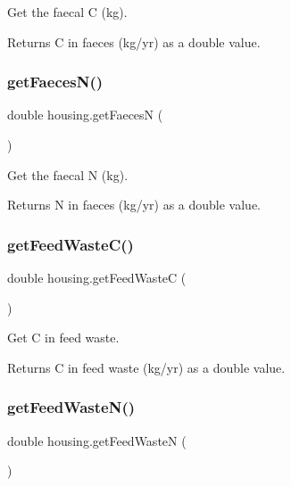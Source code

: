 Get the faecal C (kg). 

\begin{DoxyReturn}{Returns}
C in faeces (kg/yr) as a double value. 
\end{DoxyReturn}
\mbox{\label{classhousing_ae77b6199b98972e871a376aaeaf59bcd}} 
\subsubsection{\texorpdfstring{getFaecesN()}{getFaecesN()}}
{\footnotesize\ttfamily double housing.\+get\+FaecesN (\begin{DoxyParamCaption}{ }\end{DoxyParamCaption})\hspace{0.3cm}{\ttfamily [inline]}}



Get the faecal N (kg). 

\begin{DoxyReturn}{Returns}
N in faeces (kg/yr) as a double value. 
\end{DoxyReturn}
\mbox{\label{classhousing_a2ebee76702a20e253334752f00b0af8d}} 
\subsubsection{\texorpdfstring{getFeedWasteC()}{getFeedWasteC()}}
{\footnotesize\ttfamily double housing.\+get\+Feed\+WasteC (\begin{DoxyParamCaption}{ }\end{DoxyParamCaption})\hspace{0.3cm}{\ttfamily [inline]}}



Get C in feed waste. 

\begin{DoxyReturn}{Returns}
C in feed waste (kg/yr) as a double value. 
\end{DoxyReturn}
\mbox{\label{classhousing_ae8a214a1856077d2e02faa1be7d38e81}} 
\subsubsection{\texorpdfstring{getFeedWasteN()}{getFeedWasteN()}}
{\footnotesize\ttfamily double housing.\+get\+Feed\+WasteN (\begin{DoxyParamCaption}{ }\end{DoxyParamCaption})\hspace{0.3cm}{\ttfamily [inline]}}



